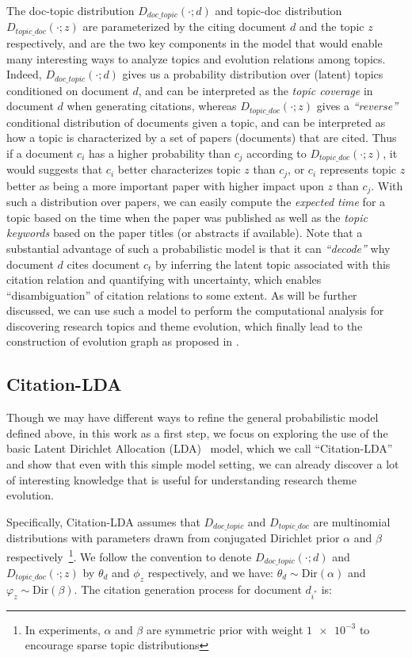 The doc-topic distribution $D_{doc\_topic}(\cdot;d)$ and topic-doc distribution
$D_{topic\_doc}(\cdot;z)$ are parameterized by the citing document $d$ and the
topic $z$ respectively, and are the two key components in the model that would
enable many interesting ways to analyze topics and evolution relations among
topics.  Indeed, $D_{doc\_topic}(\cdot;d)$ gives us a probability distribution
over (latent) topics conditioned on document $d$, and can be interpreted as the
\emph{topic coverage} in document $d$ when generating citations, whereas
$D_{topic\_doc}(\cdot;z)$ gives a \emph{``reverse''} conditional distribution of
documents given a topic, and can be interpreted as how a topic is characterized
by a set of papers (documents) that are cited.  Thus if a document $c_i$ has a
higher probability than $c_j$  according to  $D_{topic\_doc}(\cdot;z)$, it would
suggests that $c_i$ better characterizes topic $z$ than $c_j$, or $c_i$
represents topic $z$ better as being a more important paper with higher impact
upon $z$ than $c_j$.  With such a distribution over papers, we can easily
compute the \emph{expected time} for a topic based on the time when the paper
was published as well as the \emph{topic keywords} based on the paper titles (or
abstracts if available).  Note that a substantial advantage of such a
probabilistic model is that it can \emph{``decode''} why document $d$ cites
document $c_t$ by inferring the latent topic associated with this citation
relation and quantifying with uncertainty, which enables ``disambiguation'' of
citation relations to some extent.  As will be further discussed, we can use
such a model to perform the computational analysis for discovering research
topics and theme evolution, which finally lead to the construction of evolution
graph as proposed in .


\subsection{Citation-LDA}

Though we may have different ways to refine the general probabilistic model
defined above, in this work as a first step, we focus on exploring the use of
the basic Latent Dirichlet Allocation (LDA)~\cite{blei2003latent} model, which
we call ``Citation-LDA'' and show that even with this simple model setting, we
can already discover a lot of interesting knowledge that is useful for
understanding research theme evolution.

Specifically, Citation-LDA assumes that $D_{doc\_topic}$ and $D_{topic\_doc}$
are multinomial distributions with parameters drawn from conjugated Dirichlet
prior $\alpha$ and $\beta$ respectively~\footnote{In experiments, $\alpha$ and
$\beta$ are symmetric prior with weight $\num{1e-3}$ to encourage sparse topic
distributions}. We follow the convention to denote $D_{doc\_topic}(\cdot;d)$ and
$D_{topic\_doc}(\cdot;z)$  by $\theta_d$ and $\phi_z$ respectively, and we have:
$\theta_d \sim \mathrm{Dir}(\alpha)$ and $\varphi_z \sim \mathrm{Dir}(\beta)$.
The citation generation process for document $d_{i^*}$ is:

